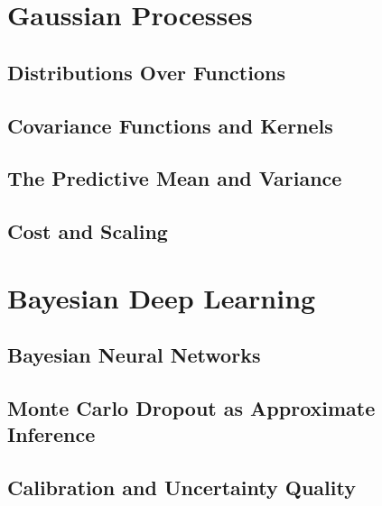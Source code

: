 \section{Gaussian Processes}
\label{sec:gaussian-processes}

\subsection{Distributions Over Functions}

\subsection{Covariance Functions and Kernels}


\subsection{The Predictive Mean and Variance}

\subsection{Cost and Scaling}

\section{Bayesian Deep Learning}
\label{sec:bayesian-deep-learning}

\subsection{Bayesian Neural Networks}

\subsection{Monte Carlo Dropout as Approximate Inference}


\subsection{Calibration and Uncertainty Quality}
